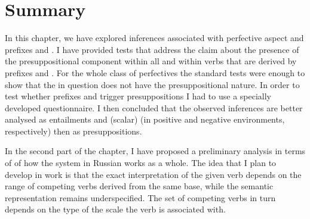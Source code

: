 \section{Summary}
In this chapter, we have explored inferences associated with perfective aspect and prefixes  and . I have provided tests that address the claim about the presence of the presuppositional component within all  and within verbs that are derived by prefixes  and . For the whole class of perfectives the standard tests were enough to show that the  in question does not have the presuppositional nature. In order to test whether prefixes  and  trigger presuppositions I had to use a specially developed questionnaire. I then concluded that the observed inferences are better analysed as entailments and (scalar)  (in positive and negative environments, respectively) then as presuppositions.

In the second part of the chapter, I have proposed a preliminary analysis in terms of  of how the  system in Russian works as a whole. The idea that I plan to develop in  work is that the exact interpretation of the given verb depends on the range of competing verbs derived from the same base, while the semantic representation remains underspecified. The set of competing verbs in turn depends on the type of the scale the verb is associated with.



